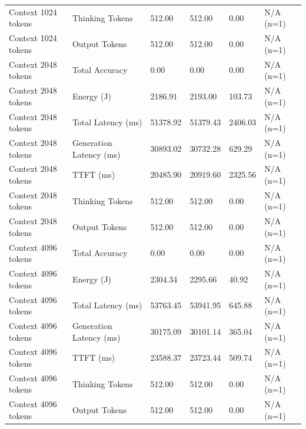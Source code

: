 \begin{table}
\begin{tabular}{llllll}
Context 1024 tokens & Thinking Tokens & 512.00 & 512.00 & 0.00 & N/A (n=1) \\
Context 1024 tokens & Output Tokens & 512.00 & 512.00 & 0.00 & N/A (n=1) \\
Context 2048 tokens & Total Accuracy & 0.00 & 0.00 & 0.00 & N/A (n=1) \\
Context 2048 tokens & Energy (J) & 2186.91 & 2193.00 & 103.73 & N/A (n=1) \\
Context 2048 tokens & Total Latency (ms) & 51378.92 & 51379.43 & 2406.03 & N/A (n=1) \\
Context 2048 tokens & Generation Latency (ms) & 30893.02 & 30732.28 & 629.29 & N/A (n=1) \\
Context 2048 tokens & TTFT (ms) & 20485.90 & 20919.60 & 2325.56 & N/A (n=1) \\
Context 2048 tokens & Thinking Tokens & 512.00 & 512.00 & 0.00 & N/A (n=1) \\
Context 2048 tokens & Output Tokens & 512.00 & 512.00 & 0.00 & N/A (n=1) \\
Context 4096 tokens & Total Accuracy & 0.00 & 0.00 & 0.00 & N/A (n=1) \\
Context 4096 tokens & Energy (J) & 2304.34 & 2295.66 & 40.92 & N/A (n=1) \\
Context 4096 tokens & Total Latency (ms) & 53763.45 & 53941.95 & 645.88 & N/A (n=1) \\
Context 4096 tokens & Generation Latency (ms) & 30175.09 & 30101.14 & 365.04 & N/A (n=1) \\
Context 4096 tokens & TTFT (ms) & 23588.37 & 23723.44 & 509.74 & N/A (n=1) \\
Context 4096 tokens & Thinking Tokens & 512.00 & 512.00 & 0.00 & N/A (n=1) \\
Context 4096 tokens & Output Tokens & 512.00 & 512.00 & 0.00 & N/A (n=1) \\
\bottomrule
\end{tabular}
\end{table}
